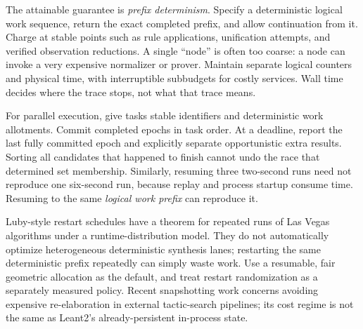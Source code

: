 The attainable guarantee is \emph{prefix determinism}. Specify a deterministic logical work sequence, return the exact completed prefix, and allow continuation from it. Charge at stable points such as rule applications, unification attempts, and verified observation reductions. A single ``node'' is often too coarse: a node can invoke a very expensive normalizer or prover. Maintain separate logical counters and physical time, with interruptible subbudgets for costly services. Wall time decides where the trace stops, not what that trace means.

For parallel execution, give tasks stable identifiers and deterministic work allotments. Commit completed epochs in task order. At a deadline, report the last fully committed epoch and explicitly separate opportunistic extra results. Sorting all candidates that happened to finish cannot undo the race that determined set membership. Similarly, resuming three two-second runs need not reproduce one six-second run, because replay and process startup consume time. Resuming to the same \emph{logical work prefix} can reproduce it.

Luby-style restart schedules have a theorem for repeated runs of Las Vegas algorithms under a runtime-distribution model. They do not automatically optimize heterogeneous deterministic synthesis lanes; restarting the same deterministic prefix repeatedly can simply waste work.\cite{luby} Use a resumable, fair geometric allocation as the default, and treat restart randomization as a separately measured policy. Recent snapshotting work concerns avoiding expensive re-elaboration in external tactic-search pipelines; its cost regime is not the same as Leant2's already-persistent in-process state.\cite{snapshot,evidence}
